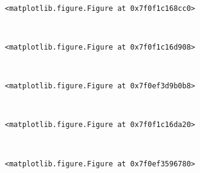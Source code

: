 \documentclass[11pt]{article}
\begin{document}
    
    \begin{center}
    \end{center}
    { \hspace*{\fill} \\}
    
    
    \begin{verbatim}
<matplotlib.figure.Figure at 0x7f0f1c168cc0>
    \end{verbatim}

    
    \begin{center}
    \end{center}
    { \hspace*{\fill} \\}
    
    
    \begin{verbatim}
<matplotlib.figure.Figure at 0x7f0f1c16d908>
    \end{verbatim}

    
    \begin{center}
    \end{center}
    { \hspace*{\fill} \\}
    
    
    \begin{verbatim}
<matplotlib.figure.Figure at 0x7f0ef3d9b0b8>
    \end{verbatim}

    
    \begin{center}
    \end{center}
    { \hspace*{\fill} \\}
    
    
    \begin{verbatim}
<matplotlib.figure.Figure at 0x7f0f1c16da20>
    \end{verbatim}

    
    \begin{center}
    \end{center}
    { \hspace*{\fill} \\}
    
    
    \begin{verbatim}
<matplotlib.figure.Figure at 0x7f0ef3596780>
    \end{verbatim}
\end{document}
